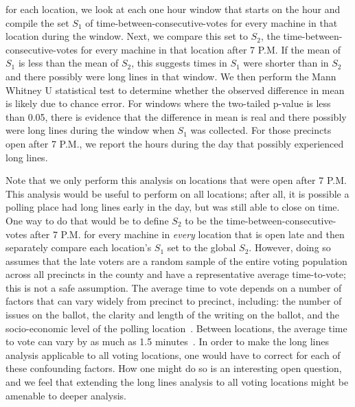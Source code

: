 \documentclass[letterpaper,twocolumn,10pt]{article}
\begin{document}
for each location, we look at each one hour window that starts on the hour and
compile the set $S_1$ of time-between-consecutive-votes for every machine in
that location during the window. Next, we compare this set to $S_2$, the
time-between-consecutive-votes for every machine in that location after 7
P.M. If the mean of $S_1$ is less than the mean of $S_2$, this suggests times in
$S_1$ were shorter than in $S_2$ and there possibly were long lines in that
window. We then perform the Mann Whitney U statistical test to determine whether
the observed difference in mean is likely due to chance error. For windows where the
two-tailed p-value is less than 0.05, there is evidence that the difference in
mean is real and there possibly were long lines during the window when $S_1$ was
collected. For those precincts open after 7 P.M., we report the hours during the
day that possibly experienced long lines.

Note that we only perform this analysis on locations that were open
after 7 P.M. This analysis would be useful to perform on all locations; after all, it is possible a polling place had long lines early in the day, but
was still able to close on time. One way to do that would be to define $S_2$ to
be the time-between-consecutive-votes after 7 P.M. for every machine in
\emph{every} location that is open late and then separately compare each location's $S_1$
set to the global $S_2$. However, doing so assumes that
the late voters are a random sample of the entire voting population across all
precincts in the county and have a representative average time-to-vote; this is
not a safe assumption. The average time to vote depends on a number of factors
that can vary widely from precinct to precinct, including: the number of issues
on the ballot, the clarity and length of the writing on the ballot, and the
socio-economic level of the polling location~\cite{Spencer2010,
  Allen2006}. Between locations, the average time to vote can vary by as much as
1.5 minutes~\cite{Spencer2010}. In order to make the long lines analysis
applicable to all voting locations, one would have to correct for each
of these confounding factors. How one might do so is an interesting open
question, and we feel that extending the long lines analysis to all voting locations
might be amenable to deeper analysis.
\end{document}
